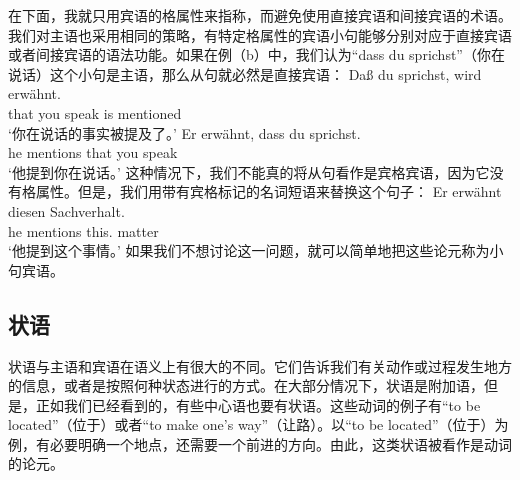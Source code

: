 在下面，我就只用宾语的格属性来指称，而避免使用直接宾语和间接宾语的术语。
我们对主语也采用相同的策略，有特定格属性的宾语小句能够分别对应于直接宾语或者间接宾语的语法功能。如果在例（b）中，我们认为“dass du sprichst”（你在说话）这个小句是主语，那么从句就必然是直接宾语：
\eal
\ex\label{Beispiel-dass-du-sprichst} 
\gll Daß du sprichst, wird erwähnt.\\
     that you speak is mentioned\\
\glt `你在说话的事实被提及了。'
\ex
\gll Er erwähnt, dass du sprichst.\\
	 he mentions that you speak\\
\glt `他提到你在说话。'
\zl
这种情况下，我们不能真的将从句看作是宾格宾语，因为它没有格属性。但是，我们用带有宾格标记的名词短语来替换这个句子：
\ea
\gll Er erwähnt diesen Sachverhalt.\\
	 he mentions this.\acc{} matter\\
\glt `他提到这个事情。'
\z
如果我们不想讨论这一问题，就可以简单地把这些论元称为小句宾语。


\subsection{状语}
\label{sec-Adverbiale}
状语与主语和宾语在语义上有很大的不同。它们告诉我们有关动作或过程发生地方的信息，或者是按照何种状态进行的方式。在大部分情况下，状语是附加语，但是，正如我们已经看到的，有些中心语也要有状语。这些动词的例子有“to be located”（位于）或者“to make one's way”（让路）。以“to be located”（位于）为例，有必要明确一个地点，还需要一个前进的方向。由此，这类状语被看作是动词的论元。

